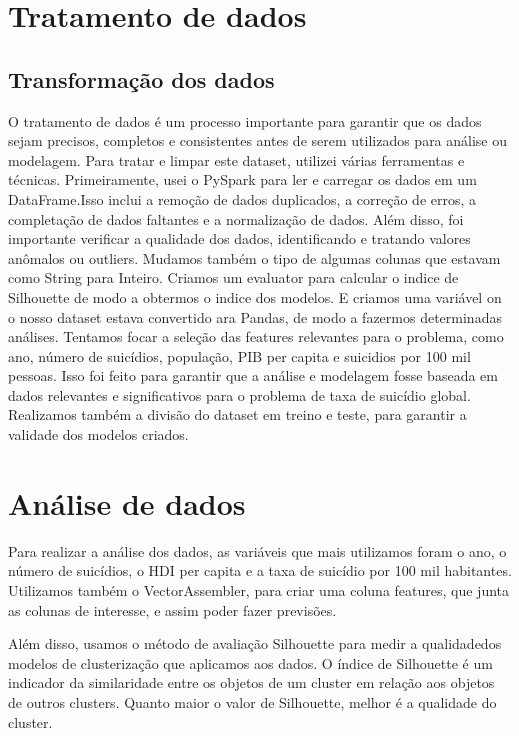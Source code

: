 \documentclass{article}
\begin{document}
\newpage

\section{Tratamento de dados}\label{sec:Tratamento}

\subsection{Transformação dos dados}\label{sec:Transformação}

O tratamento de dados é um processo importante para garantir que os dados sejam precisos, completos e consistentes antes de serem utilizados para análise ou modelagem. Para tratar e limpar este dataset, utilizei várias ferramentas e técnicas. Primeiramente, usei o PySpark para ler e carregar os dados em um DataFrame.Isso inclui a remoção de dados duplicados, a correção de erros, a completação de dados faltantes e a normalização de dados. Além disso, foi importante verificar a qualidade dos dados, identificando e tratando valores anômalos ou outliers. Mudamos também o tipo de algumas colunas que estavam como String para Inteiro. Criamos um evaluator para calcular o indice de Silhouette de modo a obtermos o indice dos modelos. E criamos uma variável on o nosso dataset estava convertido ara Pandas, de modo a fazermos determinadas análises. Tentamos focar a seleção das features relevantes para o problema, como ano, número de suicídios, população, PIB per capita e suicidios por 100 mil pessoas. Isso foi feito para garantir que a análise e modelagem fosse baseada em dados relevantes e significativos para o problema de taxa de suicídio global. Realizamos também a divisão do dataset em treino e teste, para garantir a validade dos modelos criados.


\medskip
\section{Análise de dados}\label{sec:Analise} 
Para realizar a análise dos dados, as variáveis que mais utilizamos foram  o ano, o número de suicídios, o HDI per capita e a taxa de suicídio por 100 mil habitantes. Utilizamos também o VectorAssembler, para criar uma coluna features, que junta as colunas de interesse, e assim poder fazer previsões.

Além disso, usamos o método de avaliação Silhouette para medir a qualidadedos modelos de clusterização que aplicamos aos dados. O índice de Silhouette é um indicador da similaridade entre os objetos de um cluster em relação aos objetos de outros clusters. Quanto maior o valor de Silhouette, melhor é a qualidade do cluster.
\end{document}
